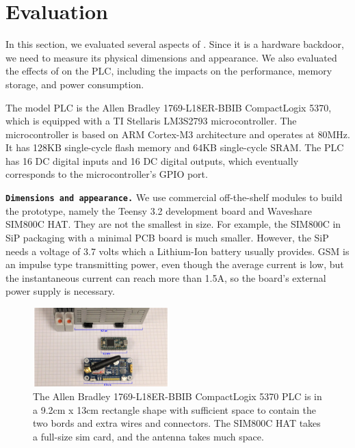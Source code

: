 \section{Evaluation}
\label{sec:implant-evaluation}

In this section, we evaluated several aspects of \name. Since it is a hardware backdoor, we need to measure its physical dimensions and appearance. We also evaluated the effects of \name on the PLC, including the impacts on the performance, memory storage, and power consumption.

The model PLC is the Allen Bradley 1769-L18ER-BBIB CompactLogix
5370, which is equipped with a TI Stellaris LM3S2793 microcontroller. The microcontroller is based on ARM Cortex-M3 architecture and operates at 80MHz. It has 128KB single-cycle flash memory and 64KB single-cycle SRAM. The PLC has 16 DC digital inputs and 16 DC digital outputs, which eventually corresponds to the microcontroller's GPIO port.

\texttt{\textbf{Dimensions and appearance.}} We use commercial off-the-shelf modules to build the prototype, namely the Teensy 3.2 development board and Waveshare SIM800C HAT. They are not the smallest in size. For example,  the SIM800C in SiP packaging with a minimal PCB board is much smaller. However, the SiP needs a voltage of 3.7 volts which a Lithium-Ion battery usually provides. GSM is an impulse type transmitting power, even though the average current is low, but the instantaneous current can reach more than 1.5A, so the board's external power supply is necessary. 

\begin{figure}[h]
	\includegraphics[width=0.47\textwidth]{figures/eval-size}
	\centering
	\caption{The Allen Bradley 1769-L18ER-BBIB CompactLogix
	5370 PLC is in a 9.2cm x 13cm rectangle shape with sufficient space to contain the two bords and extra wires and connectors. The SIM800C HAT takes a full-size sim card, and the antenna takes much space.}
	\label{fig:eval-size}
\end{figure}

